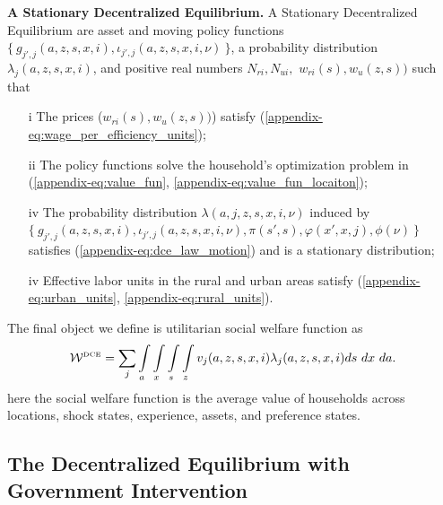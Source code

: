 \documentclass[12pt,pdftex]{article}
\begin{document}
\textbf{A Stationary Decentralized Equilibrium.} A Stationary Decentralized Equilibrium are asset and moving policy functions $\{\ g_{j',j}(a, z, s, x, i), \iota_{j',j}(a, z, s, x, i, \nu) \ \}$, a probability distribution $\lambda_{j}(a, z, s, x, i)$, and positive real numbers $N_{ri}, N_{ui},$ $w_{ri}(s), w_{u}(z, s))$ such that
\begin{itemize}
\vspace{-.4cm}
\item[i] The prices ($w_{ri}(s), w_{u}(z, s))$) satisfy (\ref{appendix-eq:wage_per_efficiency_units});
\item[ii] The policy functions solve the household's optimization problem in (\ref{appendix-eq:value_fun}, \ref{appendix-eq:value_fun_locaiton});
\item[iv] The probability distribution $\lambda(a, j, z, s, x, i, \nu)$ induced by \\
$\{\ g_{j',j}(a, z, s, x, i), \iota_{j',j}(a, z, s, x, i, \nu), \pi(s',s), \varphi(x',x,j), \phi(\nu) \ \}$ satisfies (\ref{appendix-eq:dce_law_motion}) and is a stationary distribution;
\item[iv] Effective labor units in the rural and urban areas satisfy (\ref{appendix-eq:urban_units}, \ref{appendix-eq:rural_units}).
\end{itemize}

The final object we define is utilitarian social welfare function as
\begin{align}
\mathcal{W}^{\mbox{\tiny DCE}} = \sum_{j} \int\limits_{a} \int\limits_{x} \int\limits_{s}  \int\limits_{z}  v_j(a, z, s, x, i)  \lambda_j(a, z, s, x, i) ds \ dx \ da.
\label{eq:D-social_welfare}
\end{align}
here the social welfare function is the average value of households across locations, shock states, experience, assets, and preference states.


\subsection{The Decentralized Equilibrium with Government Intervention}
\end{document}
